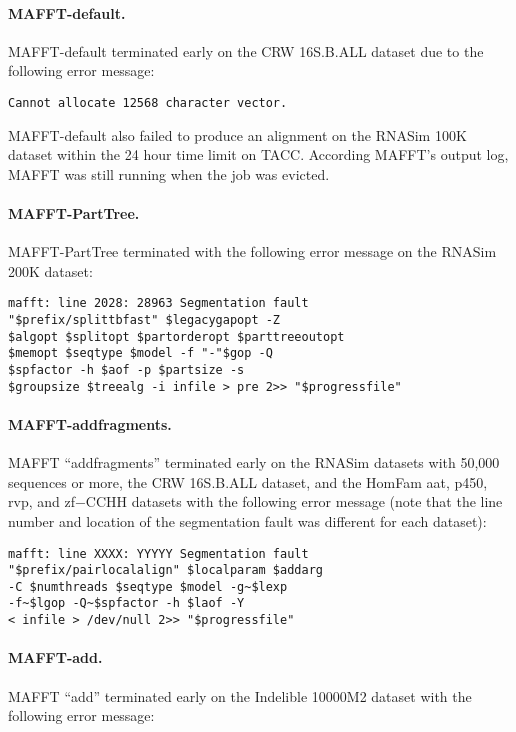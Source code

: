 \paragraph{MAFFT-default.}  MAFFT-default terminated early on the CRW 16S.B.ALL dataset due to the following error message:

\begin{verbatim} 
Cannot allocate 12568 character vector.
\end{verbatim}

MAFFT-default also failed to produce an alignment on the RNASim 100K dataset within the 24 hour time limit on TACC.  According MAFFT's output log, MAFFT was still running when the job was evicted.

\paragraph{MAFFT-PartTree.}  MAFFT-PartTree terminated with the following error message on the RNASim 200K dataset:

\begin{verbatim}
mafft: line 2028: 28963 Segmentation fault      
"$prefix/splittbfast" $legacygapopt -Z 
$algopt $splitopt $partorderopt $parttreeoutopt 
$memopt $seqtype $model -f "-"$gop -Q 
$spfactor -h $aof -p $partsize -s 
$groupsize $treealg -i infile > pre 2>> "$progressfile"
\end{verbatim}

\paragraph{MAFFT-addfragments.}  MAFFT ``addfragments'' terminated early on the RNASim datasets with 50,000 sequences or more, the CRW 16S.B.ALL dataset, and the HomFam aat, p450, rvp, and zf−CCHH datasets with the following error message (note that the line number and location of the segmentation fault was different for each dataset):

\begin{verbatim}
mafft: line XXXX: YYYYY Segmentation fault      
"$prefix/pairlocalalign" $localparam $addarg 
-C $numthreads $seqtype $model -g~$lexp 
-f~$lgop -Q~$spfactor -h $laof -Y 
< infile > /dev/null 2>> "$progressfile"
\end{verbatim}

\paragraph{MAFFT-add.}  MAFFT ``add'' terminated early on the Indelible 10000M2 dataset with the following error message: 

